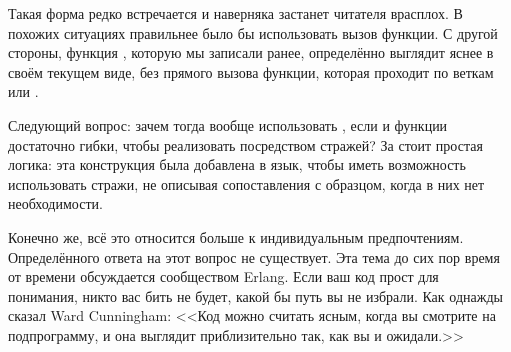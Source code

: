 Такая форма редко встречается и наверняка застанет читателя врасплох.
В похожих ситуациях правильнее было бы использовать вызов функции.
С другой стороны, функция , которую мы записали ранее, определённо выглядит яснее в своём текущем виде, без прямого вызова функции, которая проходит по веткам  или .

Следующий вопрос: зачем тогда вообще использовать , если  и функции достаточно гибки, чтобы реализовать  посредством стражей?
За  стоит простая логика: эта конструкция была добавлена в язык, чтобы иметь возможность использовать стражи, не описывая сопоставления с образцом, когда в них нет необходимости.

Конечно же, всё это относится больше к индивидуальным предпочтениям.
Определённого ответа на этот вопрос не существует.
Эта тема до сих пор время от времени обсуждается сообществом Erlang.
Если ваш код прост для понимания, никто вас бить не будет, какой бы путь вы не избрали.
Как однажды сказал Ward Cunningham: <<Код можно считать ясным, когда вы смотрите на подпрограмму, и она выглядит приблизительно так, как вы и ожидали.>>
